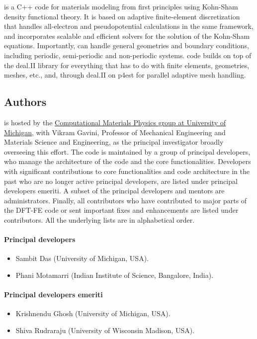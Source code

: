 \dftfe{} is a C++ code for materials modeling from first principles using Kohn-Sham density functional theory.
It is based on adaptive finite-element discretization that handles all-electron and pseudopotential calculations in the 
same framework, and incorporates scalable and efficient solvers for the solution of the Kohn-Sham equations. Importantly, \dftfe{} 
can handle general geometries and boundary conditions, including periodic, semi-periodic and non-periodic systems. \dftfe{} code 
builds on top of the deal.II library for everything that has to do with finite elements, geometries, meshes, etc., and, through 
deal.II on p4est for parallel adaptive mesh handling.

\subsection{Authors}
\label{sec:authors}
\dftfe{} is hosted by the \href{http://www-personal.umich.edu/~vikramg/}{Computational Materials Physics
group at University of Michigan}, with Vikram Gavini, Professor of Mechanical Engineering and Materials Science and 
Engineering, as the principal investigator broadly overseeing this effort. The code is maintained by a group of principal developers, 
who manage the architecture of the code and the core functionalities. Developers with
significant contributions to core functionalities and code architecture in the past who are 
no longer active principal developers, are listed under principal developers emeriti. 
A subset of the principal developers and mentors are administrators. Finally, all contributors who have
contributed to major parts of the DFT-FE code or sent important fixes and enhancements are listed
under contributors. All the underlying lists are in alphabetical order. 

\paragraph{Principal developers}
\begin{itemize}
	\item Sambit Das (University of Michigan, USA).
	\item Phani Motamarri (Indian Institute of Science, Bangalore, India).
\end{itemize}

\paragraph{Principal developers emeriti}
\begin{itemize}
	\item Krishnendu Ghosh (University of Michigan, USA).
	\item Shiva Rudraraju (University of Wisconsin Madison, USA).	
\end{itemize}

